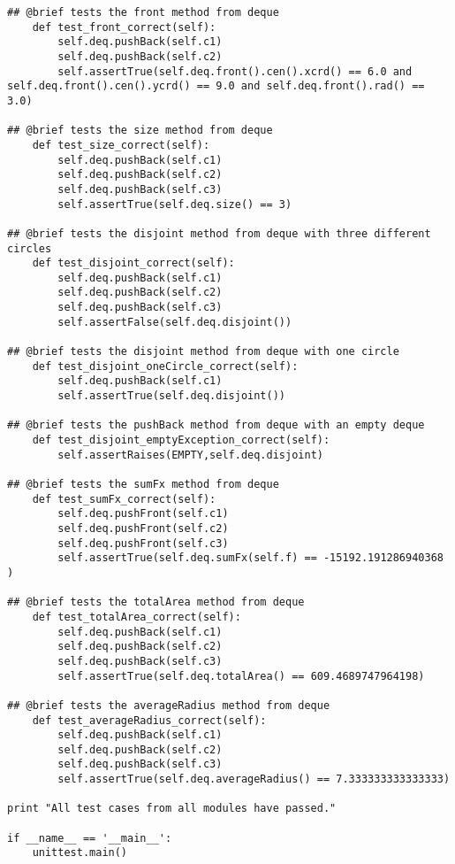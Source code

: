 \documentclass[12pt]{article}
\begin{document}
\begin{lstlisting}
## @brief tests the front method from deque
    def test_front_correct(self):
        self.deq.pushBack(self.c1)
        self.deq.pushBack(self.c2)
        self.assertTrue(self.deq.front().cen().xcrd() == 6.0 and self.deq.front().cen().ycrd() == 9.0 and self.deq.front().rad() == 3.0)

## @brief tests the size method from deque
    def test_size_correct(self):
        self.deq.pushBack(self.c1)
        self.deq.pushBack(self.c2)
        self.deq.pushBack(self.c3)
        self.assertTrue(self.deq.size() == 3)
        
## @brief tests the disjoint method from deque with three different circles
    def test_disjoint_correct(self):
        self.deq.pushBack(self.c1)
        self.deq.pushBack(self.c2)
        self.deq.pushBack(self.c3)
        self.assertFalse(self.deq.disjoint())

## @brief tests the disjoint method from deque with one circle
    def test_disjoint_oneCircle_correct(self):
        self.deq.pushBack(self.c1)
        self.assertTrue(self.deq.disjoint())
    
## @brief tests the pushBack method from deque with an empty deque
    def test_disjoint_emptyException_correct(self):
        self.assertRaises(EMPTY,self.deq.disjoint)

## @brief tests the sumFx method from deque
    def test_sumFx_correct(self):
        self.deq.pushFront(self.c1)
        self.deq.pushFront(self.c2)
        self.deq.pushFront(self.c3)
        self.assertTrue(self.deq.sumFx(self.f) == -15192.191286940368 )

## @brief tests the totalArea method from deque
    def test_totalArea_correct(self):
        self.deq.pushBack(self.c1)
        self.deq.pushBack(self.c2)
        self.deq.pushBack(self.c3)
        self.assertTrue(self.deq.totalArea() == 609.4689747964198)

## @brief tests the averageRadius method from deque
    def test_averageRadius_correct(self):
        self.deq.pushBack(self.c1)
        self.deq.pushBack(self.c2)
        self.deq.pushBack(self.c3)
        self.assertTrue(self.deq.averageRadius() == 7.333333333333333)
 
print "All test cases from all modules have passed."
        
if __name__ == '__main__':
    unittest.main()


\end{lstlisting}

~\newline
\end{document}
